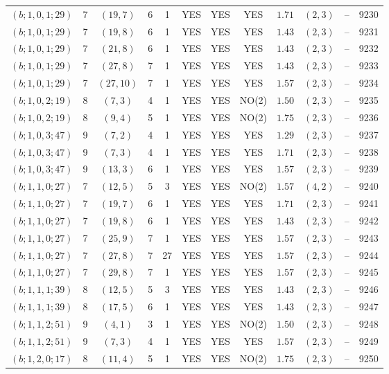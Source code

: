 \begin{longtable}{|c|c|c|c|c|c|c|c|c|c|c|c|}
$(b;1,0,1;29)$ & 7 & $(19,7)$ & 6 & 1 & YES & YES & YES & $1.71$ & $(2,3)$ & -- & 9230\\
$(b;1,0,1;29)$ & 7 & $(19,8)$ & 6 & 1 & YES & YES & YES & $1.43$ & $(2,3)$ & -- & 9231\\
$(b;1,0,1;29)$ & 7 & $(21,8)$ & 6 & 1 & YES & YES & YES & $1.43$ & $(2,3)$ & -- & 9232\\
$(b;1,0,1;29)$ & 7 & $(27,8)$ & 7 & 1 & YES & YES & YES & $1.43$ & $(2,3)$ & -- & 9233\\
$(b;1,0,1;29)$ & 7 & $(27,10)$ & 7 & 1 & YES & YES & YES & $1.57$ & $(2,3)$ & -- & 9234\\
$(b;1,0,2;19)$ & 8 & $(7,3)$ & 4 & 1 & YES & YES & NO(2) & $1.50$ & $(2,3)$ & -- & 9235\\
$(b;1,0,2;19)$ & 8 & $(9,4)$ & 5 & 1 & YES & YES & NO(2) & $1.75$ & $(2,3)$ & -- & 9236\\
$(b;1,0,3;47)$ & 9 & $(7,2)$ & 4 & 1 & YES & YES & YES & $1.29$ & $(2,3)$ & -- & 9237\\
$(b;1,0,3;47)$ & 9 & $(7,3)$ & 4 & 1 & YES & YES & YES & $1.71$ & $(2,3)$ & -- & 9238\\
$(b;1,0,3;47)$ & 9 & $(13,3)$ & 6 & 1 & YES & YES & YES & $1.57$ & $(2,3)$ & -- & 9239\\
$(b;1,1,0;27)$ & 7 & $(12,5)$ & 5 & 3 & YES & YES & NO(2) & $1.57$ & $(4,2)$ & -- & 9240\\
$(b;1,1,0;27)$ & 7 & $(19,7)$ & 6 & 1 & YES & YES & YES & $1.71$ & $(2,3)$ & -- & 9241\\
$(b;1,1,0;27)$ & 7 & $(19,8)$ & 6 & 1 & YES & YES & YES & $1.43$ & $(2,3)$ & -- & 9242\\
$(b;1,1,0;27)$ & 7 & $(25,9)$ & 7 & 1 & YES & YES & YES & $1.57$ & $(2,3)$ & -- & 9243\\
$(b;1,1,0;27)$ & 7 & $(27,8)$ & 7 & 27 & YES & YES & YES & $1.57$ & $(2,3)$ & -- & 9244\\
$(b;1,1,0;27)$ & 7 & $(29,8)$ & 7 & 1 & YES & YES & YES & $1.57$ & $(2,3)$ & -- & 9245\\
$(b;1,1,1;39)$ & 8 & $(12,5)$ & 5 & 3 & YES & YES & YES & $1.43$ & $(2,3)$ & -- & 9246\\
$(b;1,1,1;39)$ & 8 & $(17,5)$ & 6 & 1 & YES & YES & YES & $1.43$ & $(2,3)$ & -- & 9247\\
$(b;1,1,2;51)$ & 9 & $(4,1)$ & 3 & 1 & YES & YES & NO(2) & $1.50$ & $(2,3)$ & -- & 9248\\
$(b;1,1,2;51)$ & 9 & $(7,3)$ & 4 & 1 & YES & YES & YES & $1.57$ & $(2,3)$ & -- & 9249\\
$(b;1,2,0;17)$ & 8 & $(11,4)$ & 5 & 1 & YES & YES & NO(2) & $1.75$ & $(2,3)$ & -- & 9250\\

\end{longtable}
